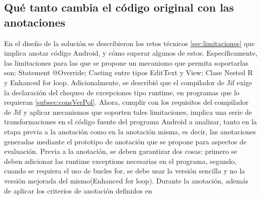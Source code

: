 \subsection{Qué tanto cambia el código original con las anotaciones}
\label{subsec:cambios}
En el diseño de la solución se describieron los retos
técnicos \ref{sec:limitaciones} que implica anotar código Android, y cómo
superar algunos de estos. Específicamente, las limitaciones para las que se propone un
mecanismo que permita soportarlas son: Statement @Override; Casting entre tipos
EditText y View; Clase Nested R y Enhanced for loop.
% 
Adicionalmente, se describió que el compilador de Jif exige la declaración del
chequeo de excepciones tipo runtime, en programas que lo
requieran \ref{subsec:consVerPol}. Ahora, cumplir con los requisitos del
compilador de Jif y aplicar mecanismos que soporten tales limitaciones, implica
una serie de transformaciones en el código fuente del programa Android a
analizar, tanto en la etapa previa a la anotación como en la anotación
misma, es decir, las anotaciones generadas mediante el prototipo de anotación 
que se propone para aspectos de evaluación.\newline
Previa a la anotación, se deben garantizar dos cosas: primero se deben adicionar
las runtime exceptions necesarias en el programa, segundo, cuando se requiera el
uso de bucles for, se debe usar la versión sencilla y no la versión mejorada del
mismo(Enhanced for loop).\newline 
Durante la anotación, además de aplicar los criterios de anotación definidos en
